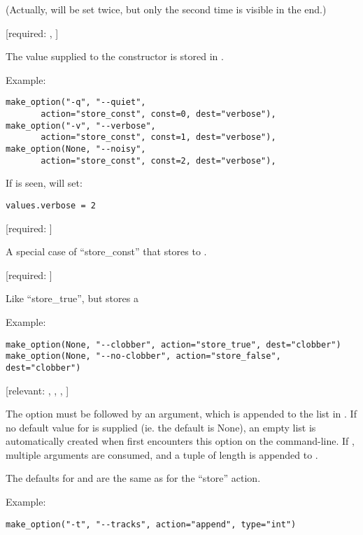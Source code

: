 \begin{definitions}
(Actually,  will be set twice, but only the second
time is visible in the end.)

 [required: , ]

The  value supplied to the  constructor is
stored in .

Example:

\begin{verbatim}
make_option("-q", "--quiet",
       action="store_const", const=0, dest="verbose"),
make_option("-v", "--verbose",
       action="store_const", const=1, dest="verbose"),
make_option(None, "--noisy",
       action="store_const", const=2, dest="verbose"),
\end{verbatim}

If  is seen,  will set:

\begin{verbatim}
values.verbose = 2
\end{verbatim}

 [required: ]

A special case of ``store_const'' that stores  to .

 [required: ]

Like ``store_true'', but stores a 

Example:

\begin{verbatim}
make_option(None, "--clobber", action="store_true", dest="clobber")
make_option(None, "--no-clobber", action="store_false", dest="clobber")
\end{verbatim}

 [relevant: , , , ]

The option must be followed by an argument, which is appended to the
list in . If no default value for  is supplied
(ie. the default is None), an empty list is automatically created when
 first encounters this option on the command-line.
If , multiple arguments are consumed, and a tuple of
length  is appended to .

The defaults for  and  are the same as for the
``store'' action.

Example:

\begin{verbatim}
make_option("-t", "--tracks", action="append", type="int")
\end{verbatim}


\end{definitions}
